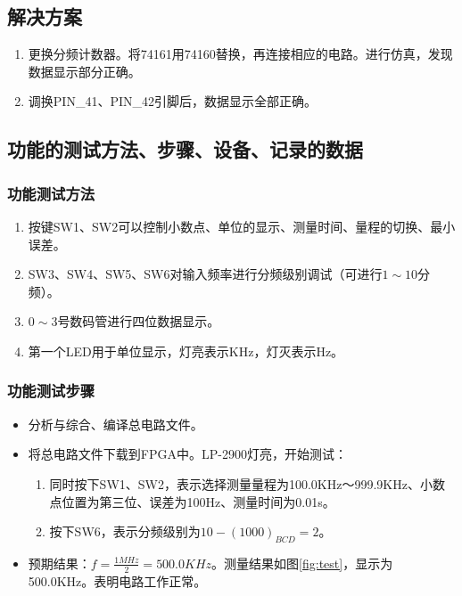 \documentclass[12pt]{article}
\begin{document}
\subsection{解决方案}

\begin{enumerate}
    \item 更换分频计数器。将74161用74160替换，再连接相应的电路。进行仿真，发现数据显示部分正确。
    \item 调换PIN\_41、PIN\_42引脚后，数据显示全部正确。
\end{enumerate}

\subsection{功能的测试方法、步骤、设备、记录的数据}

\subsubsection*{功能测试方法}

\begin{enumerate}
    \item 按键SW1、SW2可以控制小数点、单位的显示、测量时间、量程的切换、最小误差。
    \item SW3、SW4、SW5、SW6对输入频率进行分频级别调试（可进行$1 \sim 10$分频）。
    \item $0 \sim 3$号数码管进行四位数据显示。
    \item 第一个LED用于单位显示，灯亮表示KHz，灯灭表示Hz。
\end{enumerate}

\subsubsection*{功能测试步骤}

\begin{itemize}
    \item 分析与综合、编译总电路文件。
    \item 将总电路文件下载到FPGA中。LP-2900灯亮，开始测试：
    \begin{enumerate}
        \item 同时按下SW1、SW2，表示选择测量量程为100.0KHz～999.9KHz、小数点位置为第三位、误差为100Hz、测量时间为0.01s。
        \item 按下SW6，表示分频级别为$10-(1000)_{BCD} = 2$。
    \end{enumerate}
    \item 预期结果：$f = \frac{1MHz}{2} = 500.0 KHz$。测量结果如图\ref*{fig:test}，显示为500.0KHz。表明电路工作正常。
\end{itemize}
\end{document}
